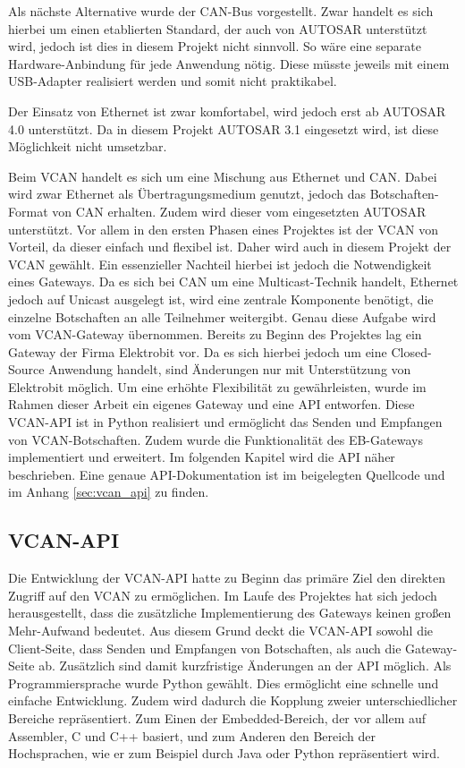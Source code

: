 \documentclass[
  a4paper,					    %
  twoside,
  DIV=calc,     				%
  bibliography=totoc,
  cleardoublepage=empty,
  ngerman,     					%
  final       					%
]{scrbook}
\begin{document}
Als nächste Alternative wurde der CAN-Bus vorgestellt. Zwar handelt es sich hierbei um einen etablierten Standard, der auch von AUTOSAR unterstützt wird, jedoch ist dies in diesem Projekt nicht sinnvoll. So wäre eine separate Hardware-Anbindung für jede Anwendung nötig. Diese müsste jeweils mit einem USB-Adapter realisiert werden und somit nicht praktikabel.

Der Einsatz von Ethernet ist zwar komfortabel, wird jedoch erst ab AUTOSAR 4.0 unterstützt. Da in diesem Projekt AUTOSAR 3.1 eingesetzt wird, ist diese Möglichkeit nicht umsetzbar.

Beim VCAN handelt es sich um eine Mischung aus Ethernet und CAN. Dabei wird zwar Ethernet als Übertragungsmedium genutzt, jedoch das Botschaften-Format von CAN erhalten. Zudem wird dieser vom eingesetzten AUTOSAR unterstützt. Vor allem in den ersten Phasen eines Projektes ist der VCAN von Vorteil, da dieser einfach und flexibel ist. Daher wird auch in diesem Projekt der VCAN gewählt. Ein essenzieller Nachteil hierbei ist jedoch die Notwendigkeit eines Gateways. Da es sich bei CAN um eine Multicast-Technik handelt, Ethernet jedoch auf Unicast ausgelegt ist, wird eine zentrale Komponente benötigt, die einzelne Botschaften an alle Teilnehmer weitergibt. Genau diese Aufgabe wird vom VCAN-Gateway übernommen. Bereits zu Beginn des Projektes lag ein Gateway der Firma Elektrobit vor. Da es sich hierbei jedoch um eine Closed-Source Anwendung handelt, sind Änderungen nur mit Unterstützung von Elektrobit möglich. Um eine erhöhte Flexibilität zu gewährleisten, wurde im Rahmen dieser Arbeit ein eigenes Gateway und eine API entworfen. Diese VCAN-API ist in Python realisiert und ermöglicht das Senden und Empfangen von VCAN-Botschaften. Zudem wurde die Funktionalität des EB-Gateways implementiert und erweitert. Im folgenden Kapitel wird die API näher beschrieben. Eine genaue API-Dokumentation ist im beigelegten Quellcode und im Anhang \ref{sec:vcan_api} zu finden.


\subsection{VCAN-API}
\label{sec:VCAN_API}
Die Entwicklung der VCAN-API hatte zu Beginn das primäre Ziel den direkten Zugriff auf den VCAN zu ermöglichen. Im Laufe des Projektes hat sich jedoch herausgestellt, dass die zusätzliche Implementierung des Gateways keinen großen Mehr-Aufwand bedeutet. Aus diesem Grund deckt die VCAN-API sowohl die Client-Seite, dass Senden und Empfangen von Botschaften, als auch die Gateway-Seite ab. Zusätzlich sind damit kurzfristige Änderungen an der API möglich. Als Programmiersprache wurde Python gewählt. Dies ermöglicht eine schnelle und einfache Entwicklung. Zudem wird dadurch die Kopplung zweier unterschiedlicher Bereiche repräsentiert. Zum Einen der Embedded-Bereich, der vor allem auf Assembler, C und C++ basiert, und zum Anderen den Bereich der Hochsprachen, wie er zum Beispiel durch Java oder Python repräsentiert wird.
\end{document}
